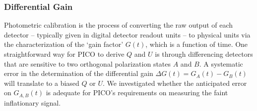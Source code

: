 \documentclass[PICOReport.tex]{subfiles}
\begin{document}

\subsubsection{Differential Gain}
\label{sec:gain_stability}

Photometric calibration is the process of converting the raw output of each detector -- typically given in digital detector readout units -- to physical units via the characterization of the `gain factor' $G(t)$, which is a function of time. One straightforward way for PICO to derive $Q$ and $U$ is through differencing detectors that are sensitive to two orthogonal polarization states $A$ and $B$. A systematic error in the determination of the differential gain $\Delta G(t) = G_{A}(t) - G_{B}(t)$ will translate to a biased $Q$ or $U$. We investigated whether the anticipated error on $G_{A,B} (t)$ is adequate for PICO's requirements on measuring the faint inflationary signal.  
\end{document}
